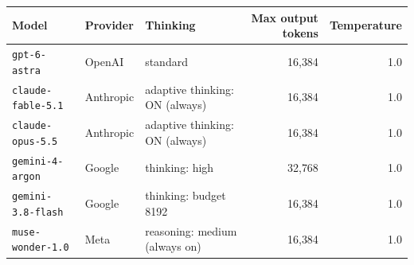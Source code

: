 \begin{tabular}{lllrr}
\toprule
Model & Provider & Thinking & Max output tokens & Temperature \\
\midrule
\texttt{gpt-6-astra} & OpenAI & standard & 16{,}384 & 1.0 \\
\texttt{claude-fable-5.1} & Anthropic & adaptive thinking: ON (always) & 16{,}384 & 1.0 \\
\texttt{claude-opus-5.5} & Anthropic & adaptive thinking: ON (always) & 16{,}384 & 1.0 \\
\texttt{gemini-4-argon} & Google & thinking: high & 32{,}768 & 1.0 \\
\texttt{gemini-3.8-flash} & Google & thinking: budget 8192 & 16{,}384 & 1.0 \\
\texttt{muse-wonder-1.0} & Meta & reasoning: medium (always on) & 16{,}384 & 1.0 \\
\bottomrule
\end{tabular}

